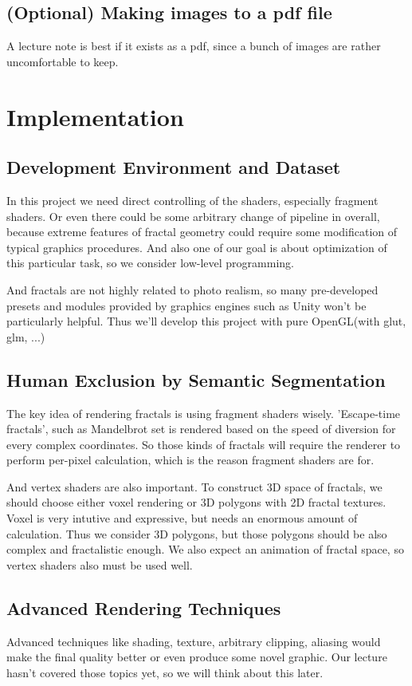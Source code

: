 \documentclass[a4paper]{article}
\begin{document}
\subsection{(Optional) Making images to a pdf file}
A lecture note is best if it exists as a pdf, since a bunch of images are rather uncomfortable to keep.

\section{Implementation}
\subsection{Development Environment and Dataset}
In this project we need direct controlling of the shaders, especially fragment shaders.
Or even there could be some arbitrary change of pipeline in overall, because extreme features of fractal geometry could require some modification of typical graphics procedures.
And also one of our goal is about optimization of this particular task, so we consider low-level programming.

And fractals are not highly related to photo realism, so many pre-developed presets and modules provided by
graphics engines such as Unity won't be particularly helpful.
Thus we'll develop this project with pure OpenGL(with glut, glm, ...)
\subsection{Human Exclusion by Semantic Segmentation}
The key idea of rendering fractals is using fragment shaders wisely.
'Escape-time fractals', such as Mandelbrot set is rendered based on the speed of diversion for every complex coordinates.
So those kinds of fractals will require the renderer to perform per-pixel calculation, which is the reason fragment shaders are for.

And vertex shaders are also important.
To construct 3D space of fractals, we should choose either voxel rendering or 3D polygons with 2D fractal textures.
Voxel is very intutive and expressive, but needs an enormous amount of calculation.
Thus we consider 3D polygons, but those polygons should be also complex and fractalistic enough.
We also expect an animation of fractal space, so vertex shaders also must be used well.
\subsection{Advanced Rendering Techniques}
Advanced techniques like shading, texture, arbitrary clipping, aliasing would make the final quality better or even produce some novel graphic.
Our lecture hasn't covered those topics yet, so we will think about this later.
\end{document}
